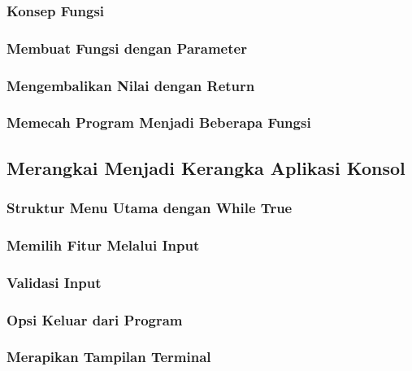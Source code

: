 \documentclass[12pt,a4paper]{article}
\begin{document}
\subsubsection{Konsep Fungsi}

\subsubsection{Membuat Fungsi dengan Parameter}

\subsubsection{Mengembalikan Nilai dengan Return}

\subsubsection{Memecah Program Menjadi Beberapa Fungsi}

\subsection{Merangkai Menjadi Kerangka Aplikasi Konsol}

\subsubsection{Struktur Menu Utama dengan While True}

\subsubsection{Memilih Fitur Melalui Input}

\subsubsection{Validasi Input}

\subsubsection{Opsi Keluar dari Program}

\subsubsection{Merapikan Tampilan Terminal}
\end{document}
